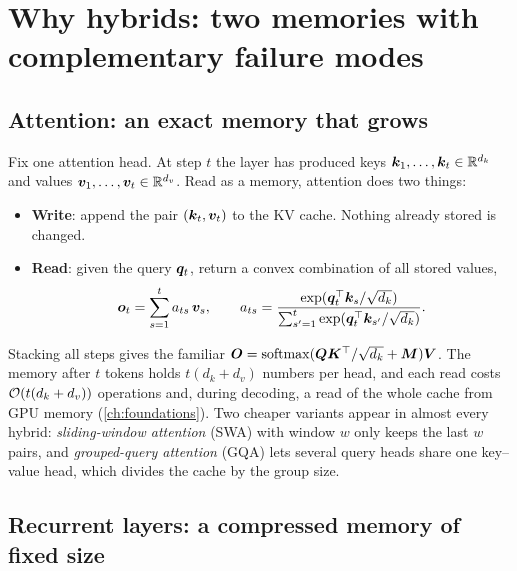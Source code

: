 \section{Why hybrids: two memories with complementary failure modes}\label{sec:c12-background}

\subsection{Attention: an exact memory that grows}\label{sec:c12-attn-memory}

Fix one attention head. At step $t$ the layer has produced keys $\bm{k}_1,\dots,\bm{k}_t \in
\mathbb{R}^{d_k}$ and values $\bm{v}_1,\dots,\bm{v}_t \in \mathbb{R}^{d_v}$. Read as a memory, attention does two
things:
\begin{itemize}
  \item \textbf{Write}: append the pair $(\bm{k}_t, \bm{v}_t)$ to the KV cache. Nothing already stored
  is changed.
  \item \textbf{Read}: given the query $\bm{q}_t$, return a convex combination of all stored values,
  \begin{equation}\label{eq:c12-attn-read}
    \bm{o}_t = \sum_{s=1}^{t} a_{ts}\, \bm{v}_s, \qquad
    a_{ts} = \frac{\exp(\bm{q}_t^{\top}\bm{k}_s/\sqrt{d_k})}{\sum_{s'=1}^{t}\exp(\bm{q}_t^{\top}\bm{k}_{s'}/\sqrt{d_k})}.
  \end{equation}
\end{itemize}
Stacking all steps gives the familiar $\bm{O} = \operatorname{softmax}(\bm{Q}\bm{K}^{\top}/\sqrt{d_k} + \bm{M})\bm{V}$. The memory
after $t$ tokens holds $t(d_k + d_v)$ numbers per head, and each read costs $\mathcal{O}(t(d_k+d_v))$
operations and, during decoding, a read of the whole cache from GPU memory
(\cref{ch:foundations}). Two cheaper variants appear in almost every hybrid:
\emph{sliding-window attention} (SWA) with window $w$ only keeps the last $w$ pairs, and
\emph{grouped-query attention} (GQA) lets several query heads share one key--value head, which
divides the cache by the group size.

\subsection{Recurrent layers: a compressed memory of fixed size}\label{sec:c12-rec-memory}

